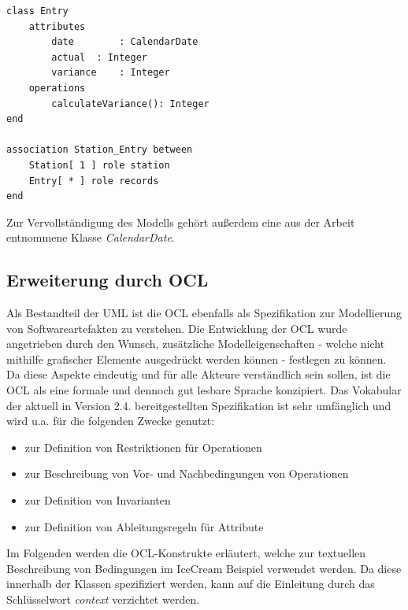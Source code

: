 \documentclass[a4paper,twoside]{article}
\begin{document}
\begin{lstlisting}[caption={USE-Spezifikation der Klasse Entry und der Assoziation zwischen einer Station und deren Entries},label=lst:assocs2]
class Entry
	attributes
		date		: CalendarDate
		actual	: Integer
		variance	: Integer
	operations
		calculateVariance(): Integer 
end

association Station_Entry between
	Station[ 1 ] role station
	Entry[ * ] role records
end
\end{lstlisting}

Zur Vervollständigung des Modells gehört außerdem eine aus der Arbeit \cite{SilvaMasterThesis} entnommene Klasse \textit{CalendarDate}.

\subsection{Erweiterung durch OCL} 
\label{ssec:ocl}
Als Bestandteil der UML ist die OCL ebenfalls als Spezifikation zur Modellierung von Softwareartefakten zu verstehen. Die Entwicklung der OCL wurde angetrieben durch den Wunsch, zusätzliche Modelleigenschaften - welche nicht mithilfe grafischer Elemente ausgedrückt werden können - festlegen zu können. \cite[S.5f]{OCLFormal} Da diese Aspekte eindeutig und für alle Akteure verständlich sein sollen, ist die OCL als eine formale und dennoch gut lesbare Sprache konzipiert. Das Vokabular der aktuell in Version 2.4. bereitgestellten Spezifikation ist sehr umfänglich und wird u.a. für die folgenden Zwecke genutzt: \begin{itemize}
\item zur Definition von Restriktionen für Operationen
\item zur Beschreibung von Vor- und Nachbedingungen von Operationen 
\item zur Definition von Invarianten
\item zur Definition von Ableitungsregeln für Attribute
\end{itemize} 
Im Folgenden werden die OCL-Konstrukte erläutert, welche zur textuellen Beschreibung von Bedingungen im IceCream Beispiel verwendet werden. Da diese innerhalb der Klassen spezifiziert werden, kann auf die Einleitung durch das Schlüsselwort \textit{context} verzichtet werden.
\\
\end{document}
